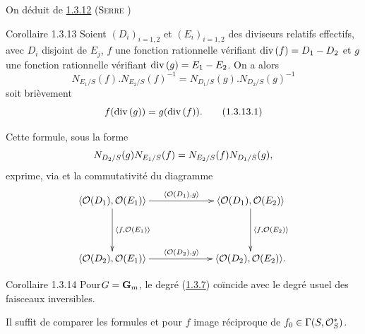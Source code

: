 \documentclass[10pt]{../fichiers-configuration-latex/smfart}
\begin{document}
On déduit de \hyperref[XVIII.prop1.3.12]{1.3.12} (\cf \textsc{Serre}
\cite[Ch.~III, prop.~7, p.~46]{SGA4-18:6})

\begin{enonce*}{Corollaire 1.3.13}
Soient $(D_{i})_{i=1,2}$ et $(E_{i})_{i=1,2}$ des diviseurs relatifs
effectifs, avec $D_{i}$ disjoint de $E_{j}$, $f$ une fonction
rationnelle vérifiant $\text{\rm div\,}(f)=D_{1}-D_{2}$ et $g$ une
fonction rationnelle vérifiant $\text{\rm div\,}(g)=E_{1}-E_{2}$. On a alors
$$
N_{E_{1}/S}(f).N_{E_{2}/S}(f)^{-1}=N_{D_{1}/S}(g).N_{D_{2}/S}(g)^{-1}
$$
soit brièvement
\begin{equation*}
f(\text{\rm div\,}(g))=g(\text{\rm div\,}(f)){}.\tag{1.3.13.1}
\end{equation*}
\end{enonce*}

Cette formule, sous la forme
$$
N_{D_{2}/S}(g)N_{E_{1}/S}(f)=N_{E_{2}/S}(f)N_{D_{1}/S}(g){},
$$
exprime, via  et  la commutativité du
diagramme  
$$
\xymatrix@C=2.25cm@R=1.5cm{
\langle \Oo(D_1), \Oo(E_1)\rangle   \ar[r]^{\langle \Oo(D_1), g\rangle } \ar[d]^{\langle f,\Oo(E_1)\rangle }&
\langle \Oo(D_1),\Oo(E_2)\rangle  \ar[d]^{\langle f,\Oo(E_2)\rangle }\\
\langle \Oo(D_2), \Oo(E_1)\rangle   \ar[r]^{\langle \Oo(D_2),g\rangle } & \langle \Oo(D_2), \Oo(E_2)\rangle .
}
$$

\begin{enonce*}{Corollaire 1.3.14}
Pour\pageoriginale $G=\mathbf{G}_{m}$, le degré (\hyperref[XVIII.subsubsec1.3.7]{1.3.7}) coïncide
avec le degré usuel des faisceaux inversibles.
\end{enonce*}

Il suffit de comparer les formules  et  pour $f$
image réciproque de $f_0\in \Gamma(S,{\mathcal O}^{\ast}_{S})$.

\setcounter{subsubsection}{14}
\end{document}
